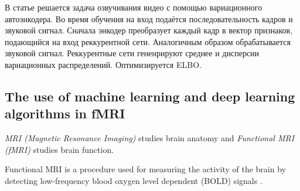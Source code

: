 \documentclass{article}
\begin{document}
В статье \cite{https://doi.org/10.48550/arxiv.2011.07340} решается задача озвучивания видео с помощью вариационного автоэнкодера. Во время обучения на вход подаётся последовательность кадров и звуковой сигнал. Сначала энкодер преобразует каждый кадр в вектор признаков, подающийся на вход реккурентной сети. Аналогичным образом обрабатывается звуковой сигнал. Реккурентные сети гененрируют среднее и дисперсии вариационных распределений. Оптимизируется ELBO.

\subsection{The use of machine learning and deep learning algorithms in fMRI} 



\textit{MRI (Magnetic Resonance Imaging)} studies brain anatomy and \textit{Functional MRI (fMRI)} studies brain function.



Functional MRI is a procedure used for measuring the activity of the brain by detecting low-frequency blood oxygen level dependent (BOLD) signals \cite{mldlfmri}.
\end{document}

